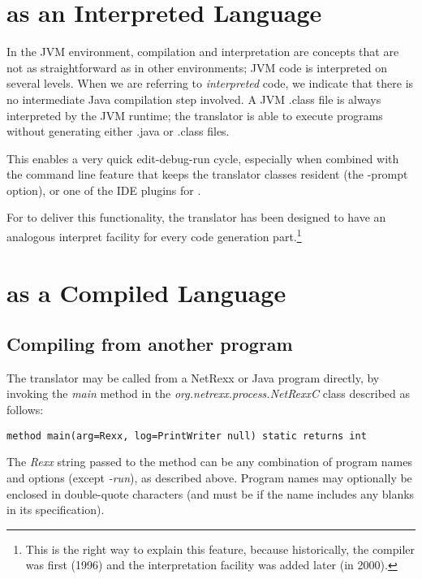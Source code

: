 {\chapter{\nr{} as an Interpreted Language}\label{interpreted}
In the JVM environment, compilation and interpretation are concepts
that are not as straightforward as in other environments; JVM code is
interpreted on several levels. When we are referring to
\emph{interpreted} \nr{} code, we indicate that there is no
intermediate Java compilation step involved. A JVM .class file is
always interpreted by the JVM runtime; the \nr{} translator is able to
execute programs without generating either .java or .class files.

This enables a very quick edit-debug-run cycle, especially when
combined with the command line feature that keeps the translator
classes resident (the -prompt option), or one of the IDE plugins for
\nr{}.

For \nr{} to deliver this functionality, the translator has been
designed to have an analogous interpret facility for every code
generation part.\footnote{This is the right way to explain this
  feature, because historically, the compiler was first (1996) and the
  interpretation facility was added later (in 2000).}

\chapter{\nr{} as a Compiled Language}
\section{Compiling from another program}

The translator may be called from a NetRexx or Java program directly, by
invoking the \emph{main} method in the \emph{org.netrexx.process.NetRexxC}
class described as follows:

\begin{lstlisting}[label=ivmain,caption=Invoking NetRexxC.main]
method main(arg=Rexx, log=PrintWriter null) static returns int
\end{lstlisting}

The \emph{Rexx} string passed to the method can be any combination of
program names and options (except \emph{-run}), as described above.
Program names may optionally be enclosed in double-quote characters (and
must be if the name includes any blanks in its specification).

}
